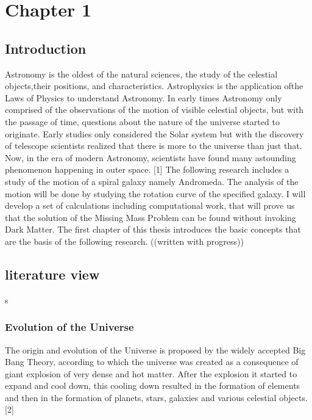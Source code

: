 \documentclass{article}
\begin{document}
\section{Chapter 1}
\subsection{Introduction}
Astronomy is the oldest of the natural sciences, the study of the celestial objects,their positions, and characteristics. Astrophysics is the application ofthe Laws of Physics to understand Astronomy. In early times Astronomy only comprised of the observations of the motion of visible celestial objects, but with the passage of time, questions about the nature of the universe started to originate. Early studies only considered the Solar system but with the discovery of telescope scientists realized that there is more to the universe than just that. Now, in the era of modern Astronomy, scientists have found many astounding phenomenon happening in outer space. [1]
The following research includes a study of the motion of a spiral galaxy namely Andromeda. The analysis of the motion will be done by studying the rotation curve of the specified galaxy. I will develop a set of calculations including computational work, that will prove us that the solution of the Missing Mass Problem can be found without invoking Dark Matter. 
The first chapter of this thesis introduces the basic concepts that are the basis of the following research.
((written with progress)) 
\subsection{literature view}s
\subsubsection{Evolution of the Universe}
 The origin and evolution of the Universe is proposed by the widely accepted Big Bang Theory, according to which the universe was created as a consequence of giant explosion of very dense and hot matter. After the explosion it started to expand and cool down, this cooling down resulted in the formation of elements and then in the formation of planets, stars, galaxies and various celestial objects. [2]
 
\end{document}
